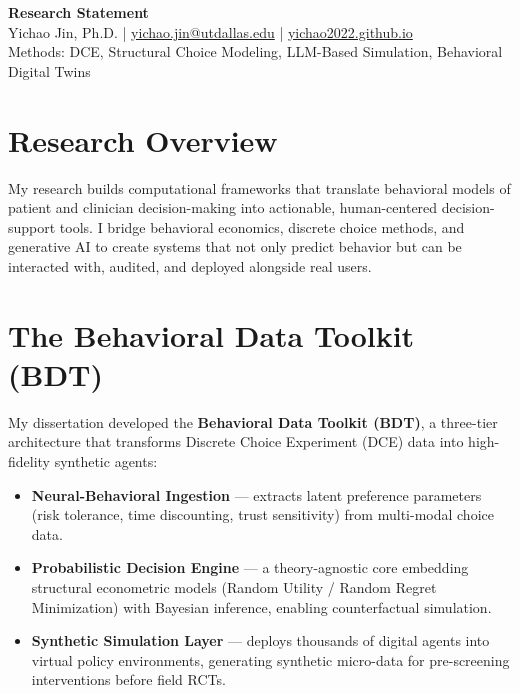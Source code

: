 \documentclass[11pt,a4paper]{article}
\begin{document}
\pagestyle{empty}

\begin{center}
    {\Large \bfseries \sffamily \color{slate} Research Statement} \\
    \vspace{0.2cm}
    {\small Yichao Jin, Ph.D. \quad | \quad \href{mailto:yichao.jin@utdallas.edu}{yichao.jin@utdallas.edu} \quad | \quad \href{https://yichao2022.github.io}{yichao2022.github.io}} \\
    {\small Methods: DCE, Structural Choice Modeling, LLM-Based Simulation, Behavioral Digital Twins}
\end{center}

\vspace{0.15cm}

\section*{Research Overview}

My research builds computational frameworks that translate behavioral models of patient and clinician decision-making into actionable, human-centered decision-support tools. I bridge behavioral economics, discrete choice methods, and generative AI to create systems that not only predict behavior but can be interacted with, audited, and deployed alongside real users.

\section*{The Behavioral Data Toolkit (BDT)}

My dissertation developed the \textbf{Behavioral Data Toolkit (BDT)}, a three-tier architecture that transforms Discrete Choice Experiment (DCE) data into high-fidelity synthetic agents:

\begin{itemize}[leftmargin=*, nosep]
    \item \textbf{Neural-Behavioral Ingestion} --- extracts latent preference parameters (risk tolerance, time discounting, trust sensitivity) from multi-modal choice data.
    \item \textbf{Probabilistic Decision Engine} --- a theory-agnostic core embedding structural econometric models (Random Utility / Random Regret Minimization) with Bayesian inference, enabling counterfactual simulation.
    \item \textbf{Synthetic Simulation Layer} --- deploys thousands of digital agents into virtual policy environments, generating synthetic micro-data for pre-screening interventions before field RCTs.
\end{itemize}
\end{document}

